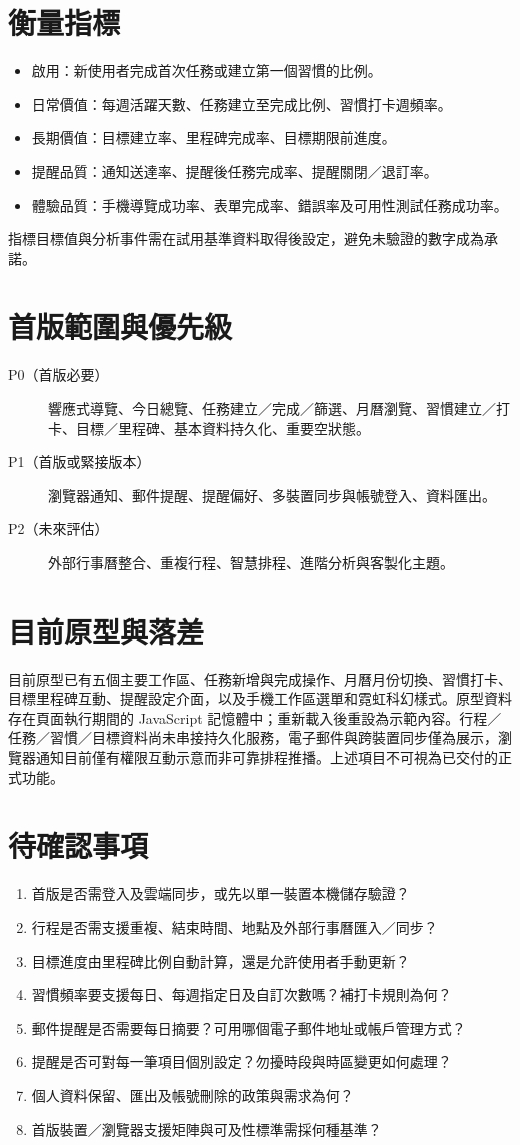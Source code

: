 \documentclass[12pt]{article}
\begin{document}
\section{衡量指標}
\begin{itemize}
\item 啟用：新使用者完成首次任務或建立第一個習慣的比例。
\item 日常價值：每週活躍天數、任務建立至完成比例、習慣打卡週頻率。
\item 長期價值：目標建立率、里程碑完成率、目標期限前進度。
\item 提醒品質：通知送達率、提醒後任務完成率、提醒關閉／退訂率。
\item 體驗品質：手機導覽成功率、表單完成率、錯誤率及可用性測試任務成功率。
\end{itemize}
指標目標值與分析事件需在試用基準資料取得後設定，避免未驗證的數字成為承諾。
\section{首版範圍與優先級}
\begin{description}
\item[P0（首版必要）] 響應式導覽、今日總覽、任務建立／完成／篩選、月曆瀏覽、習慣建立／打卡、目標／里程碑、基本資料持久化、重要空狀態。
\item[P1（首版或緊接版本）] 瀏覽器通知、郵件提醒、提醒偏好、多裝置同步與帳號登入、資料匯出。
\item[P2（未來評估）] 外部行事曆整合、重複行程、智慧排程、進階分析與客製化主題。
\end{description}
\section{目前原型與落差}
目前原型已有五個主要工作區、任務新增與完成操作、月曆月份切換、習慣打卡、目標里程碑互動、提醒設定介面，以及手機工作區選單和霓虹科幻樣式。原型資料存在頁面執行期間的 JavaScript 記憶體中；重新載入後重設為示範內容。行程／任務／習慣／目標資料尚未串接持久化服務，電子郵件與跨裝置同步僅為展示，瀏覽器通知目前僅有權限互動示意而非可靠排程推播。上述項目不可視為已交付的正式功能。
\section{待確認事項}
\begin{enumerate}
\item 首版是否需登入及雲端同步，或先以單一裝置本機儲存驗證？
\item 行程是否需支援重複、結束時間、地點及外部行事曆匯入／同步？
\item 目標進度由里程碑比例自動計算，還是允許使用者手動更新？
\item 習慣頻率要支援每日、每週指定日及自訂次數嗎？補打卡規則為何？
\item 郵件提醒是否需要每日摘要？可用哪個電子郵件地址或帳戶管理方式？
\item 提醒是否可對每一筆項目個別設定？勿擾時段與時區變更如何處理？
\item 個人資料保留、匯出及帳號刪除的政策與需求為何？
\item 首版裝置／瀏覽器支援矩陣與可及性標準需採何種基準？
\end{enumerate}
\end{document}
